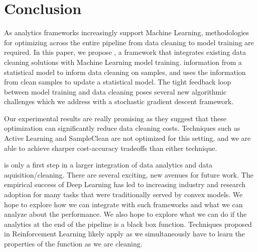 \section{Conclusion}
As analytics frameworks increasingly support Machine Learning, methodologies for optimizing across the entire pipeline from data cleaning to model training are required.
In this paper, we propose \sysfull, a framework that integrates existing data cleaning solutions with Machine Learning model training.
\sys information from a statistical model to inform data cleaning on samples, and uses the information from clean samples to update a statistical model.
The tight feedback loop between model training and data cleaning poses several new algorithmic challenges which we address with a stochastic gradient descent framework.

Our experimental results are really promising as they suggest that these optimization can significantly reduce data cleaning costs.
Techniques such as Active Learning and SampleClean are not optimized for this setting, and we are able to achieve sharper cost-accuracy tradeoffs than either technique.

\sys is only a first step in a larger integration of data analytics and data aquisition/cleaning. 
There are several exciting, new avenues for future work.
The empirical success of Deep Learning has led to increasing industry and research adoption for many tasks that were traditionally served by convex models.
We hope to explore how we can integrate with such frameworks and what we can analyze about the performance.
We also hope to explore what we can do if the analytics at the end of the pipeline is a black box function.
Techniques proposed in Reinforcement Learning likely apply as we simultaneously have to learn the properties of the function as we are cleaning.